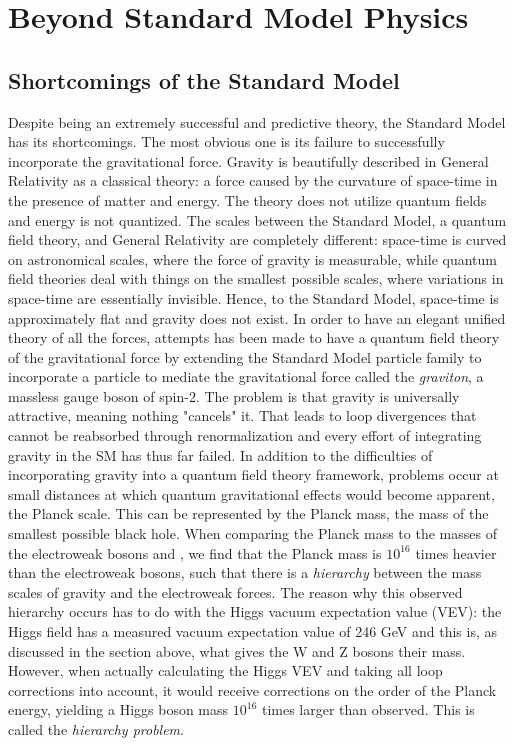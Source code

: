 \clearpage
\chapter{Beyond Standard Model Physics}
\section{Shortcomings of the Standard Model}
Despite being an extremely successful and predictive theory, the Standard Model has its shortcomings. The most obvious one is its failure to successfully incorporate the gravitational force. Gravity is beautifully described in General Relativity as a classical theory: a force caused by the curvature of space-time in the presence of matter and energy. The theory does not utilize quantum fields and energy is not quantized.
The scales between the Standard Model, a quantum field theory, and General Relativity are completely different: space-time is curved on astronomical scales, where the force of gravity is measurable, while quantum field theories deal with things on the smallest possible scales, where variations in space-time are essentially invisible. Hence, to the Standard Model, space-time is approximately flat and gravity does not exist. In order to have an elegant unified theory of all the forces, attempts has been made to have a quantum field theory of the gravitational force by extending the Standard Model particle family to incorporate a particle to mediate the gravitational force called the \emph{graviton}, a massless gauge boson of spin-2. The problem is that gravity is universally attractive, meaning nothing "cancels" it. That leads to loop divergences that cannot be reabsorbed through renormalization and every effort of integrating gravity in the SM has thus far failed. 
In addition to the difficulties of incorporating gravity into a quantum field theory framework, problems occur at small distances at which quantum gravitational effects would become apparent, the Planck scale. This can be represented by the Planck mass, the mass of the smallest possible black hole. When comparing the Planck mass to the masses of the electroweak bosons \PW and \PZ, we find that the Planck mass is $10^{16}$ times heavier than the electroweak bosons, such that there is a \emph{hierarchy} between the mass scales of gravity and the electroweak forces. The reason why this observed hierarchy occurs has to do with the Higgs vacuum expectation value (VEV): the Higgs field has a measured vacuum expectation value of 246 GeV and this is, as discussed in the section above, what gives the W and Z bosons their mass. However, when actually calculating the Higgs VEV and taking all loop corrections into account, it would receive corrections on the order of the Planck energy, yielding a Higgs boson mass $10^{16}$ times larger than observed. This is called the \emph{hierarchy problem}.
